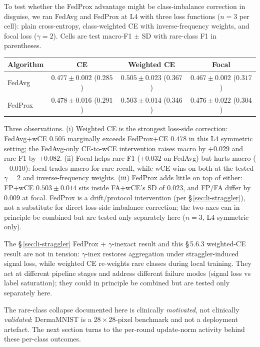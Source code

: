 \documentclass[11pt,a4paper]{report}
\begin{document}
To test whether the FedProx advantage might be class-imbalance correction
in disguise, we ran FedAvg and FedProx at L4 with three loss functions
($n=3$ per cell): plain cross-entropy, class-weighted CE with
inverse-frequency weights, and focal loss ($\gamma = 2$). Cells are test
macro-F1 $\pm$ SD with rare-class F1 in parentheses.

\begin{center}
\begin{tabular}{lccc}
\hline
Algorithm & CE & Weighted CE & Focal \\
\hline
FedAvg  & $0.477 \pm 0.002$ ($0.285$) & $\mathbf{0.505 \pm 0.023}$ ($\mathbf{0.367}$) & $0.467 \pm 0.002$ ($0.317$) \\
FedProx & $0.478 \pm 0.016$ ($0.291$) & $0.503 \pm 0.014$ ($0.346$)                   & $0.476 \pm 0.022$ ($0.304$) \\
\hline
\end{tabular}
\end{center}

Three observations. (i) Weighted CE is the strongest loss-side correction:
FedAvg+wCE $0.505$ marginally exceeds FedProx+CE $0.478$ in this L4
symmetric setting; the FedAvg-only CE-to-wCE intervention raises macro by
$+0.029$ and rare-F1 by $+0.082$. (ii) Focal helps rare-F1 ($+0.032$ on
FedAvg) but hurts macro ($-0.010$): focal trades macro for rare-recall,
while wCE wins on both at the tested $\gamma=2$ and inverse-frequency
weights. (iii) FedProx adds little on top of either: FP+wCE
$0.503 \pm 0.014$ sits inside FA+wCE's SD of $0.023$, and FP/FA differ by
$0.009$ at focal. FedProx is a drift/protocol intervention (per
\S\,\ref{sec:li-straggler}), not a substitute for direct loss-side
imbalance correction; the two axes can in principle be combined but are
tested only separately here ($n=3$, L4 symmetric only).

The \S\,\ref{sec:li-straggler} FedProx + $\gamma$-inexact result and this
\S\,5.6.3 weighted-CE result are not in tension: $\gamma$-inex restores
aggregation under straggler-induced signal loss, while weighted CE
re-weights rare classes during local training. They act at different
pipeline stages and address different failure modes (signal loss vs label
saturation); they could in principle be combined but are tested only
separately here.

The rare-class collapse documented here is clinically \emph{motivated},
not clinically \emph{validated}: DermaMNIST is a $28 \times 28$-pixel
benchmark and not a deployment artefact. The next section turns to the
per-round update-norm activity behind these per-class outcomes.
\end{document}
